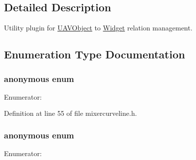 \subsection{\-Detailed \-Description}
\-Utility plugin for \hyperlink{class_u_a_v_object}{\-U\-A\-V\-Object} to \hyperlink{class_widget}{\-Widget} relation management. 

\subsection{\-Enumeration \-Type \-Documentation}
\hypertarget{group___u_a_v_object_widget_utils_gaa1ed12ae47b3b5c3b75c99c63986575d}{\subsubsection[{anonymous enum}]{\setlength{\rightskip}{0pt plus 5cm}anonymous enum}}\label{group___u_a_v_object_widget_utils_gaa1ed12ae47b3b5c3b75c99c63986575d}
\begin{Desc}
\item[\-Enumerator\-: ]\par
\begin{description}
\item[{\em 
\hypertarget{group___u_a_v_object_widget_utils_ggaa1ed12ae47b3b5c3b75c99c63986575da59a3ef5ffd963601ffda52bb7bf42b3c}{\-Type}\label{group___u_a_v_object_widget_utils_ggaa1ed12ae47b3b5c3b75c99c63986575da59a3ef5ffd963601ffda52bb7bf42b3c}
}]\end{description}
\end{Desc}



\-Definition at line 55 of file mixercurveline.\-h.

\hypertarget{group___u_a_v_object_widget_utils_gacfcbe9e0a1b137ea0afeca0789e5e398}{\subsubsection[{anonymous enum}]{\setlength{\rightskip}{0pt plus 5cm}anonymous enum}}\label{group___u_a_v_object_widget_utils_gacfcbe9e0a1b137ea0afeca0789e5e398}
\begin{Desc}
\item[\-Enumerator\-: ]\par
\begin{description}
\item[{\em 
\hypertarget{group___u_a_v_object_widget_utils_ggacfcbe9e0a1b137ea0afeca0789e5e398ae34bb4f715b22e70e0a2182529bed883}{\-Type}\label{group___u_a_v_object_widget_utils_ggacfcbe9e0a1b137ea0afeca0789e5e398ae34bb4f715b22e70e0a2182529bed883}
}]\end{description}
\end{Desc}



